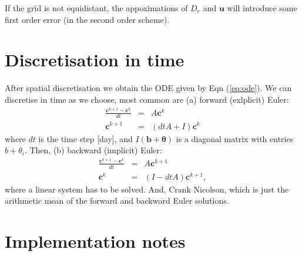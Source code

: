 \documentclass[a4paper,10pt]{article}
\begin{document}
If the grid is not equidistant, the appoximations of $D_e$ and $\mathbf{u}$ will introduce some first order error (in the second order scheme). 


\section{Discretisation in time}

After spatial discretisation we obtain the ODE given by Eqn (\ref{eq:ode}). We can discretise in time as we choose, most common are (a) forward (exlplicit) Euler:
\begin{eqnarray}
\frac{\mathbf{c}^{k+1}-\mathbf{c}^k}{dt} &=& A \mathbf{c}^k \\
\mathbf{c}^{k+1} &=& (dt A + I)\mathbf{c}^k  
\end{eqnarray}
where $dt$ is the time step [day], and $ I(\mathbf{b}+\mathbf{\theta})$ is a diagonal matrix with entries $b+\theta_i$. Then, (b) backward (implicit) Euler:
\begin{eqnarray}
 \frac{\mathbf{c}^{k+1}-\mathbf{c}^k}{dt} &=& A \mathbf{c}^{k+1} \\
  \mathbf{c}^{k} &=& (I-dt A ) \mathbf{c}^{k+1} ,  
\end{eqnarray}
where a linear system has to be solved. And, Crank Nicolson, which is just the arithmetic mean of the forward and backward Euler solutions. 


\section{Implementation notes}
\end{document}
